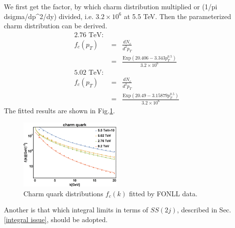 \documentclass[twocolumn,aps,superscriptaddress,nofootinbib,floatfix]{revtex4}
\begin{document}
We first get the factor, by which charm distribution multiplied or (1/pi dsigma/dp^2/dy) divided, i.e. $3.2\times10^6$ at 5.5 TeV. Then the parameterized charm distribution can be derived.
\begin{eqnarray}
	\text{2.76 TeV: }\nonumber\\ 
	f_c(p_T)&=&\frac{dN_c}{d^2 p_T}\nonumber\\ 
	&=&\frac{\text{Exp}(20.406 - 3.343 p_T^{0.5})}{3.2\times10^6}\\
	\text{5.02 TeV: }\nonumber\\ 
	f_c(p_T)&=&\frac{dN_c}{d^2 p_T}\nonumber\\ 
	&=&\frac{\text{Exp}(20.49 - 3.15879 p_T^{0.5})}{3.2\times10^6}
\end{eqnarray}
 The fitted results are shown in Fig.\ref{fig26}.
\begin{figure}[H]
	\includegraphics[width=0.45\textwidth]{FONLL.png}
	\caption{Charm quark distributions $f_c(k)$ fitted by FONLL data. }
	\label{fig26}
\end{figure}

Another is that which integral limits in terms of $SS(2j)$, described in Sec.\ref{integral issue}, should be adopted.
\end{document}

